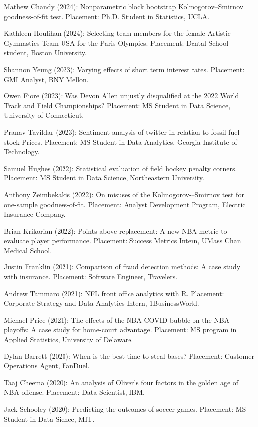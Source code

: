 \documentclass[Statistics]{vita}
\begin{document}
\begin{vita}
\begin{Students}
\begin{UndergraduateHonor}
    \item Mathew Chandy (2024): Nonparametric block bootstrap Kolmogorov--Smirnov goodness-of-fit test. Placement: Ph.D. Student in Statistics, UCLA.
    \item Kathleen Houlihan (2024): Selecting team members for the female Artistic Gymnastics Team USA for the Paris Olympics. Placement: Dental School student, Boston University.
    \item Shannon Yeung (2023): Varying effects of short term interest rates. Placement: GMI Analyst, BNY Mellon.
    \item Owen Fiore (2023): Was Devon Allen unjustly disqualified at the 2022 World Track and Field Championships? Placement: MS Student in Data Science, University of Connecticut.
    \item Pranav Tavildar (2023): Sentiment analysis of twitter in relation to fossil fuel stock Prices. Placement: MS Student in Data Analytics, Georgia Institute of Technology.
    \item Samuel Hughes (2022): Statistical evaluation of field hockey penalty corners. Placement: MS Student in Data Science, Northeastern University.
    \item Anthony Zeimbekakis (2022): On misuses of the Kolmogorov-–Smirnov test for one-sample goodness-of-fit. Placement: Analyst Development Program, Electric Insurance Company.
    \item Brian Krikorian (2022): Points above replacement: A new NBA metric to evaluate player performance. Placement: Success Metrics Intern, UMass Chan Medical School.
    \item Justin Franklin (2021): Comparison of fraud detection methods: A case study with insurance. Placement: Software Engineer, Travelers.
    \item Andrew Tammaro (2021): NFL front office analytics with R. Placement: Corporate Strategy and Data Analytics Intern, 1BusinessWorld.
    \item Michael Price (2021): The effects of the NBA COVID bubble on the NBA playoffs: A case study for home-court advantage. Placement: MS program in Applied Statistics, University of Delaware.
    \item Dylan Barrett (2020): When is the best time to steal bases? Placement: Customer Operations Agent, FanDuel.
    \item Taaj Cheema (2020): An analysis of Oliver’s four factors in the golden age of NBA offense. Placement: Data Scientist, IBM.
    \item Jack Schooley (2020): Predicting the outcomes of soccer games. Placement: MS Student in Data Sience, MIT.

\end{UndergraduateHonor}
\end{Students}
\end{vita}
\end{document}
